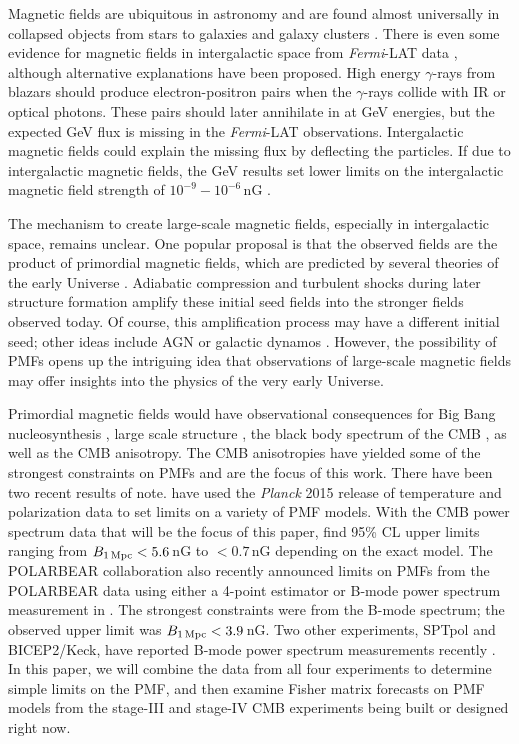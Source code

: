 \documentclass[preprint]{emulateapj}
\newcommand{\bpmf}{\ensuremath{B_{\rm 1\,Mpc}}}
\newcommand{\fermilat}{\textit{Fermi}-LAT}
\newcommand{\planck}{{\sl Planck}}
\newcommand{\bicepkeck}{BICEP2/Keck}
\newcommand{\pb}{POLARBEAR}
\newcommand{\sptpol}{SPTpol}
\begin{document}
Magnetic fields are ubiquitous in astronomy and are found almost universally in collapsed objects from stars to galaxies and galaxy clusters \citep[for review, see][]{ryu12, widrow12}. 
There is even some evidence for magnetic fields in intergalactic space from \fermilat{} data \citep{neronov10}, although alternative explanations \citep{broderick12} have been proposed. 
High energy $\gamma$-rays from blazars should  produce electron-positron pairs when the $\gamma$-rays collide with IR or optical photons. 
These pairs should later annihilate in at GeV energies, but the expected GeV flux is missing in the \fermilat{} observations. 
Intergalactic magnetic fields could explain the missing flux by deflecting the particles. 
If due to intergalactic magnetic fields, the GeV results set lower limits on the intergalactic magnetic field strength of $10^{-9} - 10^{-6}$\,nG \citep{tavecchio10,taylor11,dermer11,vovk12}. 

The mechanism to create large-scale magnetic fields, especially in intergalactic space, remains unclear. 
One popular proposal is that the observed fields are the product of primordial magnetic fields, which are predicted by several theories of the early Universe \citep[e.g.,][]{turner88, grasso98,ichiki06}. 
Adiabatic compression and turbulent shocks during later structure formation amplify these initial seed fields into the stronger fields observed today. 
Of course, this amplification process may have a different initial seed; other ideas include AGN or galactic dynamos \citep[for a review, see][]{giovannini04}. 
However, the possibility of PMFs opens up the intriguing idea that observations of large-scale magnetic fields may offer insights into the physics of the very early Universe. 


Primordial magnetic fields would have observational consequences for Big Bang nucleosynthesis \citep[e..,][]{kahniashvili10}, large scale structure \citep[e.g.,][]{battaner97}, the black body spectrum of the CMB \citep[e.g.,][]{kunze14}, as well as the CMB anisotropy. 
The CMB anisotropies have yielded some of the strongest constraints on PMFs and are the focus of this work.
There have been two recent results of note. 
\citet{planck15-19} have used the \planck{} 2015 release of temperature and polarization data to set limits on a variety of PMF models. 
With the CMB power spectrum data that will be the focus of this paper, \citet{planck15-19} find 95\% CL upper limits ranging from $\bpmf < 5.6$\,nG to $<0.7$\,nG depending on the exact model. 
The \pb{} collaboration also recently announced limits on PMFs from the \pb{} data using either a 4-point estimator or B-mode power spectrum measurement in \citep{pb}. 
The strongest constraints were from the B-mode spectrum; the observed upper limit was $\bpmf < 3.9$\,nG. 
Two other experiments, \sptpol{} and \bicepkeck{}, have reported B-mode power spectrum measurements recently \citep{}.
In this paper, we will combine the data from all four experiments to determine simple limits on the PMF, and then examine Fisher matrix forecasts on PMF models from the stage-III and stage-IV CMB experiments being built or designed right now. 
\end{document}

